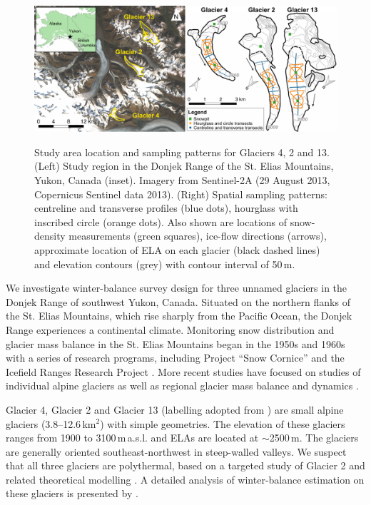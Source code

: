 \documentclass{article}
\begin{document}
\begin{figure}
	\centering
	\includegraphics[width =\textwidth]{Pulwicki_Fig1.pdf}\\
	\caption{Study area location and sampling patterns for Glaciers 4, 2 and 13. (Left) Study region in the Donjek Range of the St. Elias Mountains, Yukon, Canada (inset). Imagery from Sentinel-2A (29 August 2013, Copernicus Sentinel data 2013). (Right) Spatial sampling patterns:  centreline and transverse profiles (blue dots), hourglass with inscribed circle (orange dots). Also shown are locations of snow-density measurements  (green squares), ice-flow directions (arrows), approximate location of ELA on each glacier (black dashed lines) and elevation contours (grey) with contour interval of 50\,m.}
	\label{fig:Sampling}
\end{figure} 

We investigate winter-balance survey design for three unnamed glaciers in the Donjek Range of southwest Yukon, Canada. Situated on the northern flanks of the St. Elias Mountains, which rise sharply from the Pacific Ocean, the Donjek Range experiences a continental climate. Monitoring snow distribution and glacier mass balance in the St. Elias Mountains began in the 1950s and 1960s with a series of research programs, including Project ``Snow Cornice''  and the Icefield Ranges Research Project \citep{Wood1948, Danby2003}. More recent studies have focused on studies of individual alpine glaciers \citep[e.g.][]{Clarke2014,Flowers2014} as well as regional glacier mass balance and dynamics \citep[e.g.][]{Arendt2008, Burgess2013,Waechter2015}. 

Glacier 4, Glacier 2 and Glacier 13 (labelling adopted from \cite{Crompton2016}) are small alpine glaciers (3.8--12.6\,km$^2$) with simple geometries. The elevation of these glaciers ranges from 1900 to 3100\,m\,a.s.l. and ELAs are located at $\sim$2500\,m. The glaciers are generally oriented southeast-northwest in steep-walled valleys. We suspect that all three glaciers are polythermal, based on a targeted study of Glacier 2 \citep{Wilson2013} and related theoretical modelling \citep{Wilson2013a}. A detailed analysis of winter-balance estimation on these glaciers is presented by \cite{Pulwicki2017}.
\end{document}
